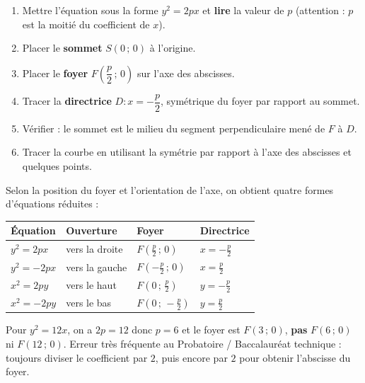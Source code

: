 \documentclass[11pt]{article}
\begin{document}
\begin{methode}[Identifier et placer les éléments d'une parabole $y^2 = 2px$]
\begin{enumerate}
\item Mettre l'équation sous la forme $y^2 = 2px$ et \textbf{lire} la valeur de $p$ (attention : $p$ est la moitié du coefficient de $x$).
\item Placer le \textbf{sommet} $S(0\,;\,0)$ à l'origine.
\item Placer le \textbf{foyer} $F\left(\dfrac{p}{2}\,;\,0\right)$ sur l'axe des abscisses.
\item Tracer la \textbf{directrice} $D : x = -\dfrac{p}{2}$, symétrique du foyer par rapport au sommet.
\item Vérifier : le sommet est le milieu du segment perpendiculaire mené de $F$ à $D$.
\item Tracer la courbe en utilisant la symétrie par rapport à l'axe des abscisses et quelques points.
\end{enumerate}
\end{methode}

Selon la position du foyer et l'orientation de l'axe, on obtient quatre formes d'équations réduites :

\begin{center}
\begin{tabularx}{\linewidth}{|l|X|X|X|}\hline
\rowcolor{popblueL} \textbf{Équation} & \textbf{Ouverture} & \textbf{Foyer} & \textbf{Directrice} \\ \hline
$y^2 = 2px$ & vers la droite & $F\left(\tfrac{p}{2}\,;\,0\right)$ & $x = -\tfrac{p}{2}$ \\ \hline
$y^2 = -2px$ & vers la gauche & $F\left(-\tfrac{p}{2}\,;\,0\right)$ & $x = \tfrac{p}{2}$ \\ \hline
$x^2 = 2py$ & vers le haut & $F\left(0\,;\,\tfrac{p}{2}\right)$ & $y = -\tfrac{p}{2}$ \\ \hline
$x^2 = -2py$ & vers le bas & $F\left(0\,;\,-\tfrac{p}{2}\right)$ & $y = \tfrac{p}{2}$ \\ \hline
\end{tabularx}
\end{center}

\begin{attention}
Pour $y^2 = 12x$, on a $2p = 12$ donc $p = 6$ et le foyer est $F(3\,;\,0)$, \textbf{pas} $F(6\,;\,0)$ ni $F(12\,;\,0)$. Erreur très fréquente au Probatoire / Baccalauréat technique : toujours diviser le coefficient par $2$, puis encore par $2$ pour obtenir l'abscisse du foyer.
\end{attention}
\end{document}
